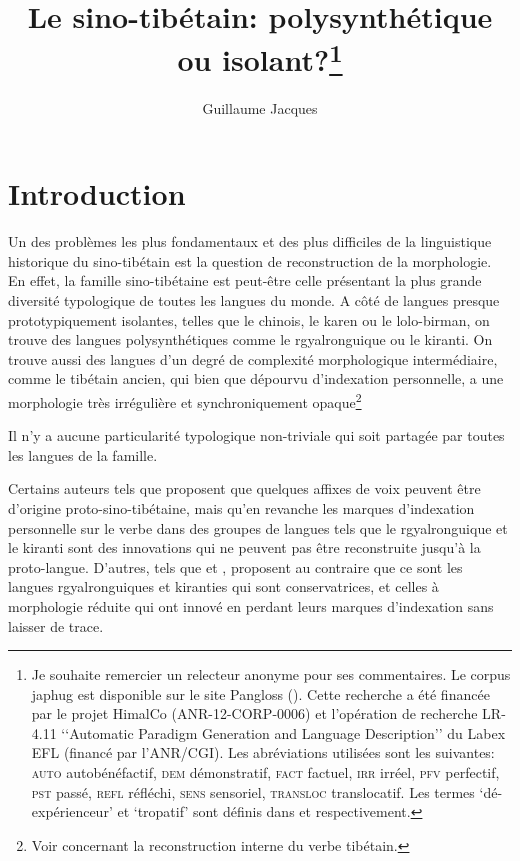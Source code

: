 \documentclass[oldfontcommands,oneside,a4paper,11pt]{article}
\begin{document}
 
\title{Le sino-tibétain: polysynthétique ou isolant?\footnote{Je souhaite remercier un relecteur anonyme pour ses commentaires. Le corpus japhug est disponible sur le site Pangloss (\citealt{michailovsky14pangloss}). Cette recherche a été financée par le projet HimalCo (ANR-12-CORP-0006) et l'opération de recherche LR-4.11 ‘‘Automatic Paradigm Generation and Language Description’’ du Labex EFL (financé par l'ANR/CGI).
Les abréviations utilisées sont les suivantes: \textsc{auto} autobénéfactif, \textsc{dem} démonstratif, \textsc{fact} factuel, \textsc{irr} irréel, \textsc{pfv} perfectif, \textsc{pst} passé, \textsc{refl} réfléchi,  \textsc{sens} sensoriel, \textsc{transloc} translocatif. Les termes `dé-expérienceur' et `tropatif' sont  définis dans \citet{jacques12demotion} et \citet{jacques13tropative} respectivement. }  }
\author{Guillaume Jacques}
\maketitle
\linenumbers

\section{Introduction}
Un des problèmes les plus fondamentaux et des plus difficiles de la linguistique historique du sino-tibétain est la question de reconstruction de la morphologie. En effet, la famille sino-tibétaine est peut-être celle présentant la plus grande diversité typologique de toutes les langues du monde. A côté de langues presque prototypiquement isolantes, telles que le chinois, le karen ou le lolo-birman, on trouve des langues polysynthétiques comme le rgyalronguique ou le kiranti. On trouve aussi des langues d'un degré de complexité morphologique intermédiaire, comme le tibétain ancien, qui bien que dépourvu d'indexation personnelle, a une morphologie très irrégulière et synchroniquement opaque\footnote{Voir \citet{hill05vbri, jacques10ndr, jacques12internal, hill14dempsey, hill14voicing, hill15lan} concernant la reconstruction interne du verbe tibétain.}

 


 Il n'y a aucune particularité typologique non-triviale qui soit partagée par toutes les langues de la famille. 

Certains auteurs tels que  \citet{lapolla03} proposent que quelques affixes de voix peuvent être d'origine proto-sino-tibétaine, mais qu'en revanche les marques d'indexation personnelle sur le verbe dans des groupes de langues tels que le rgyalronguique et le kiranti sont des innovations qui ne peuvent pas être reconstruite jusqu'à la proto-langue. D'autres, tels que  \citet{driem93agreement}  et \citet{delancey10agreement}, proposent au contraire que ce sont les langues rgyalronguiques et kiranties qui sont conservatrices, et celles à morphologie réduite qui ont innové en perdant leurs marques d'indexation sans laisser de trace.
\end{document}
